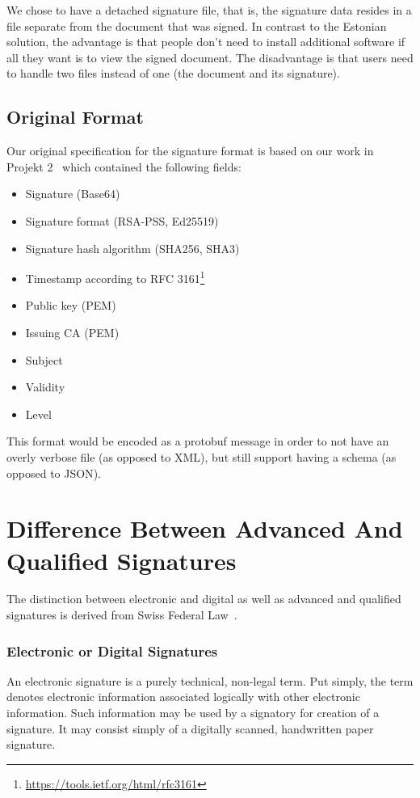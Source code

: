 We chose to have a detached signature file, that is,
the signature data resides in a file separate from the document that was signed.
In contrast to the Estonian solution,
the advantage is that people don't need to install additional software if all they want is to view the signed document.
The disadvantage is that users need to handle two files instead of one (the document and its signature).


\subsection{Original Format}\label{subsec:original-format}
Our original specification for the signature format is based on our work in Projekt 2~\cite{projekt2} which contained the following fields:

\begin{itemize}
    \item Signature (Base64)
    \item Signature format (\gls{RSA-PSS}, \gls{Ed25519})
    \item Signature hash algorithm (\gls{SHA}256, \gls{SHA}3)
    \item Timestamp according to \gls{RFC} 3161\footnote{\url{https://tools.ietf.org/html/rfc3161}}
    \item Public key (\gls{PEM})
    \item Issuing \gls{CA} (\gls{PEM})
    \item Subject
    \item Validity
    \item Level
\end{itemize}

This format would be encoded as a protobuf message in order to not have an overly verbose file (as opposed to \gls{XML}),
but still support having a schema (as opposed to \gls{JSON}).

\section{Difference Between Advanced And Qualified Signatures}\label{subsec:difference-between-advanced-and-qualified-signatures}
The distinction between electronic and digital as well as advanced and qualified signatures is derived from Swiss Federal Law~\cite{zertes}.

\subsubsection{Electronic or Digital Signatures}
An electronic signature is a purely technical, non-legal term.
Put simply, the term denotes electronic information associated logically with other electronic information.
Such information may be used by a signatory for creation of a signature.
It may consist simply of a digitally scanned, handwritten paper signature.

